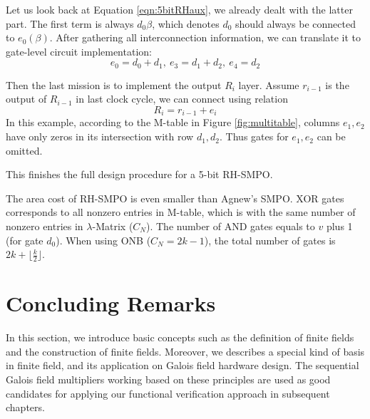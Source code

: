 \begin{Example}
Let us look back at Equation \ref{eqn:5bitRHaux}, we already dealt with the latter part.
The first term is always $d_0\beta$, which denotes $d_0$ should always be connected to $e_0(\beta)$.
After gathering all interconnection information, we can translate it to gate-level circuit implementation:
$$e_0 = d_0+d_1,~e_3=d_1+d_2,~e_4=d_2$$

Then the last mission is to implement the output $R_i$ layer. Assume $r_{i-1}$ is the output of 
$R_{i-1}$ in last clock cycle, we can connect using relation 
$$R_i = r_{i-1} + e_i$$
In this example, according to the M-table in Figure \ref{fig:multitable}, columns $e_1,e_2$
have only zeros in its intersection with row $d_1,d_2$. Thus gates for $e_1,e_2$ can be omitted.

This finishes the full design procedure for a 5-bit RH-SMPO.
\end{Example}

The area cost of RH-SMPO is even smaller than Agnew's SMPO. XOR gates corresponds to all nonzero entries 
in M-table, which is with the same number of nonzero entries in $\lambda$-Matrix ($C_N$). The number of AND gates 
equals to $v$ plus 1 (for gate $d_0$). When using ONB ($C_N = 2k-1$), the total number of gates 
is $2k+\lfloor \frac{k}{2}\rfloor$.

\section{Concluding Remarks}
In this section, we introduce basic concepts such as the definition of finite fields and the construction 
of finite fields. Moreover, we describes a special kind of basis in finite field, and its 
application on Galois field hardware design. The sequential Galois field multipliers working based on these 
principles are used as good candidates for applying our functional verification approach in subsequent chapters.